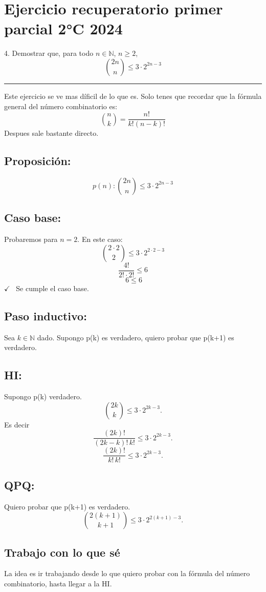 \documentclass{article}
\begin{document}
\section*{Ejercicio recuperatorio primer parcial 2°C 2024}

4. Demostrar que, para todo \( n \in \mathbb{N} \), \( n \geq 2 \),
\[
\binom{2n}{n} \leq 3 \cdot 2^{2n - 3}
\]

\noindent\rule{\textwidth}{0.4pt} %

Este ejercicio se ve mas díficil de lo que es. Solo tenes que recordar que la fórmula general del número combinatorio es:
\[
\binom{n}{k} = \frac{n!}{k!(n-k)!}
\]
Despues sale bastante directo.

\subsection*{Proposición:}
\[
p(n) : \binom{2n}{n} \leq 3 \cdot 2^{2n - 3}
\]


\subsection*{Caso base:}
Probaremos para \( n = 2 \). En este caso:
\[
\binom{2 \cdot 2}{2} \leq 3 \cdot 2^{2 \cdot 2 - 3}
\]
\[
\frac{4!}{2! \cdot 2!} \leq 6 
\]
\[
\ 6 \leq 6 
\] \(\checkmark\) \ 
Se cumple el caso base.

\subsection*{Paso inductivo:}
Sea  \( k \in \mathbb{N}\) dado. Supongo p(k) es verdadero, quiero probar que p(k+1) es verdadero.


\subsection*{HI:}
Supongo p(k) verdadero.
\[
\binom{2k}{k} \leq 3 \cdot 2^{2k - 3}.
\]
Es decir
\[
\frac{(2k)!}{(2k-k)! \, k!} \leq 3 \cdot 2^{2k-3}.
\]
\[
\frac{(2k)!}{k! \, k!} \leq 3 \cdot 2^{2k-3}.
\]

\subsection*{QPQ:}
Quiero probar que p(k+1) es verdadero. 
\[
\binom{2(k+1)}{k+1} \leq 3 \cdot 2^{2(k+1) - 3}.
\]

\subsection*{Trabajo con lo que sé}
La idea es ir trabajando desde lo que quiero probar con la fórmula del número combinatorio, hasta llegar a la HI.
\end{document}

